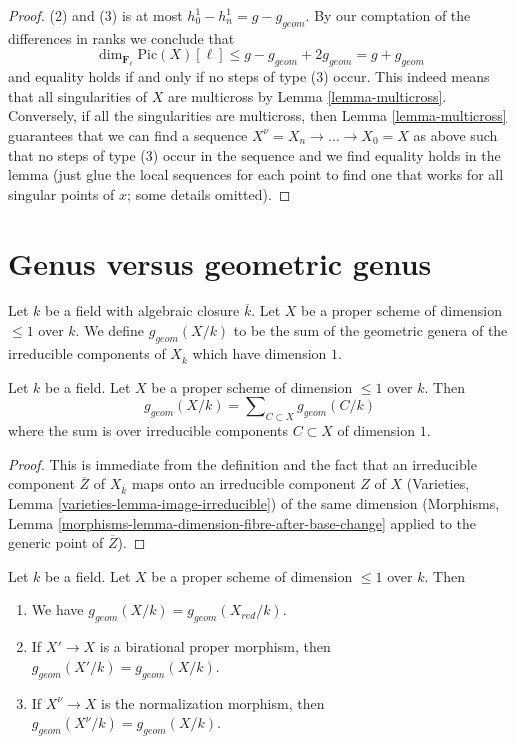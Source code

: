 \begin{proof}
(2) and (3) is at most $h^1_0 - h^1_n = g - g_{geom}$.
By our comptation of the differences in ranks we conclude that
$$
\dim_{\mathbf{F}_\ell} \text{Pic}(X)[\ell] \leq
g - g_{geom} + 2g_{geom} = g + g_{geom}
$$
and equality holds if and only if no steps of type (3) occur.
This indeed means that all singularities of $X$ are multicross
by Lemma \ref{lemma-multicross}. Conversely, if all the singularities
are multicross, then Lemma \ref{lemma-multicross} guarantees that
we can find a sequence $X^\nu = X_n \to \ldots \to X_0 = X$
as above such that no steps of type (3) occur in the sequence
and we find equality holds in the lemma (just glue the local sequences
for each point to find one that works for all singular points of $x$;
some details omitted).
\end{proof}





\section{Genus versus geometric genus}
\label{section-genus-geometric-genus}

\noindent
Let $k$ be a field with algebraic closure $\overline{k}$.
Let $X$ be a proper scheme of dimension $\leq 1$ over $k$.
We define $g_{geom}(X/k)$ to be the sum of the geometric genera
of the irreducible components of $X_{\overline{k}}$ which have dimension $1$.

\begin{lemma}
\label{lemma-bound-geometric-genus}
Let $k$ be a field. Let $X$ be a proper scheme of dimension $\leq 1$ over $k$.
Then
$$
g_{geom}(X/k) = \sum\nolimits_{C \subset X} g_{geom}(C/k)
$$
where the sum is over irreducible components $C \subset X$ of dimension $1$.
\end{lemma}

\begin{proof}
This is immediate from the definition and the fact that an irreducible
component $\overline{Z}$ of $X_{\overline{k}}$ maps onto an
irreducible component $Z$ of $X$
(Varieties, Lemma \ref{varieties-lemma-image-irreducible})
of the same dimension
(Morphisms, Lemma \ref{morphisms-lemma-dimension-fibre-after-base-change}
applied to the generic point of $\overline{Z}$).
\end{proof}

\begin{lemma}
\label{lemma-geometric-genus-normalization}
Let $k$ be a field. Let $X$ be a proper scheme of dimension $\leq 1$ over $k$.
Then
\begin{enumerate}
\item We have $g_{geom}(X/k) = g_{geom}(X_{red}/k)$.
\item If $X' \to X$ is a birational proper morphism, then
$g_{geom}(X'/k) = g_{geom}(X/k)$.
\item If $X^\nu \to X$ is the normalization morphism, then
$g_{geom}(X^\nu/k) = g_{geom}(X/k)$.
\end{enumerate}
\end{lemma}

